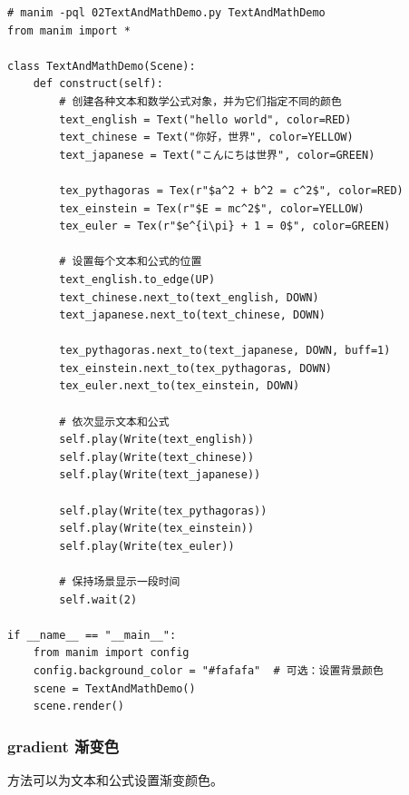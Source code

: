 \begin{lstlisting}[style=pythonstyle]
# manim -pql 02TextAndMathDemo.py TextAndMathDemo
from manim import *

class TextAndMathDemo(Scene):
    def construct(self):
        # 创建各种文本和数学公式对象，并为它们指定不同的颜色
        text_english = Text("hello world", color=RED)
        text_chinese = Text("你好，世界", color=YELLOW)
        text_japanese = Text("こんにちは世界", color=GREEN)

        tex_pythagoras = Tex(r"$a^2 + b^2 = c^2$", color=RED)
        tex_einstein = Tex(r"$E = mc^2$", color=YELLOW)
        tex_euler = Tex(r"$e^{i\pi} + 1 = 0$", color=GREEN)

        # 设置每个文本和公式的位置
        text_english.to_edge(UP)
        text_chinese.next_to(text_english, DOWN)
        text_japanese.next_to(text_chinese, DOWN)

        tex_pythagoras.next_to(text_japanese, DOWN, buff=1)
        tex_einstein.next_to(tex_pythagoras, DOWN)
        tex_euler.next_to(tex_einstein, DOWN)

        # 依次显示文本和公式
        self.play(Write(text_english))
        self.play(Write(text_chinese))
        self.play(Write(text_japanese))

        self.play(Write(tex_pythagoras))
        self.play(Write(tex_einstein))
        self.play(Write(tex_euler))

        # 保持场景显示一段时间
        self.wait(2)

if __name__ == "__main__":
    from manim import config
    config.background_color = "#fafafa"  # 可选：设置背景颜色
    scene = TextAndMathDemo()
    scene.render()
\end{lstlisting}

\subsubsection{gradient 渐变色}
\label{subsubsec:manim_text_formula_style_color_gradient}
 方法可以为文本和公式设置渐变颜色。

